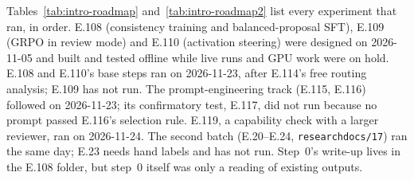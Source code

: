 \documentclass[11pt]{article}
\renewcommand{\_}{\origunderscore\allowbreak}
\begin{document}
Tables~\ref{tab:intro-roadmap} and~\ref{tab:intro-roadmap2} list every experiment that ran, in order. E.108 (consistency training and balanced-proposal SFT), E.109 (GRPO in review mode) and E.110 (activation steering) were designed on 2026-11-05 and built and tested offline while live runs and GPU work were on hold. E.108 and E.110's base steps ran on 2026-11-23, after E.114's free routing analysis; E.109 has not run. The prompt-engineering track (E.115, E.116) followed on 2026-11-23; its confirmatory test, E.117, did not run because no prompt passed E.116's selection rule. E.119, a capability check with a larger reviewer, ran on 2026-11-24. The second batch (E.20--E.24, \texttt{research\_docs/17}) ran the same day; E.23 needs hand labels and has not run. Step~0's write-up lives in the E.108 folder, but step~0 itself was only a reading of existing outputs.
\end{document}
